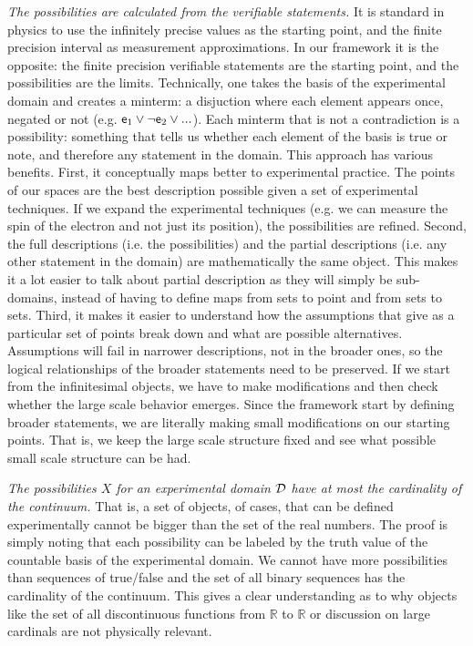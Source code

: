 \documentclass[twocolumn]{article}
\begin{document}
\textit{The possibilities are calculated from the verifiable statements.} It is standard in physics to use the infinitely precise values as the starting point, and the finite precision interval as measurement approximations. In our framework it is the opposite: the finite precision verifiable statements are the starting point, and the possibilities are the limits. Technically, one takes the basis of the experimental domain and creates a minterm: a disjuction where each element appears once, negated or not (e.g. $\stmt[e]_1\OR \NOT \stmt[e]_2 \OR ...$). Each minterm that is not a contradiction is a possibility: something that tells us whether each element of the basis is true or note, and therefore any statement in the domain. This approach has various benefits. First, it conceptually maps better to experimental practice. The points of our spaces are the best description possible given a set of experimental techniques. If we expand the experimental techniques (e.g. we can measure the spin of the electron and not just its position), the possibilities are refined. Second, the full descriptions (i.e. the possibilities) and the partial descriptions (i.e. any other statement in the domain) are mathematically the same object. This makes it a lot easier to talk about partial description as they will simply be sub-domains, instead of having to define maps from sets to point and from sets to sets. Third, it makes it easier to understand how the assumptions that give as a particular set of points break down and what are possible alternatives. Assumptions will fail in narrower descriptions, not in the broader ones, so the logical relationships of the broader statements need to be preserved. If we start from the infinitesimal objects, we have to make modifications and then check whether the large scale behavior emerges. Since the framework start by defining broader statements, we are literally making small modifications on our starting points. That is, we keep the large scale structure fixed and see what possible small scale structure can be had.

\textit{The possibilities $X$ for an experimental domain $\edomain$ have at most the cardinality of the continuum.} That is, a set of objects, of cases, that can be defined experimentally cannot be bigger than the set of the real numbers. The proof is simply noting that each possibility can be labeled by the truth value of the countable basis of the experimental domain. We cannot have more possibilities than sequences of true/false and the set of all binary sequences has the cardinality of the continuum. This gives a clear understanding as to why objects like the set of all discontinuous functions from $\mathbb{R}$ to $\mathbb{R}$ or discussion on large cardinals are not physically relevant.
\end{document}
